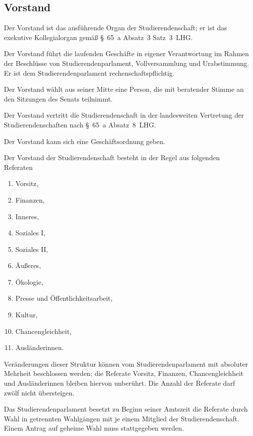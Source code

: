 \begin{contract}
%
%

\parnumberfalse \section{Vorstand} \parnumbertrue


Der Vorstand ist das ausführende Organ der Studierendenschaft; er ist das exekutive Kollegialorgan gemäß §~65~a Absatz~3 Satz~3~LHG. 

Der Vorstand führt die laufenden Geschäfte in eigener Verantwortung im Rahmen der Beschlüsse von Studierendenparlament, Vollversammlung und Urabstimmung. Er ist dem Studierendenparlament rechenschaftspflichtig.

Der Vorstand wählt aus seiner Mitte eine Person, die mit beratender Stimme an den Sitzungen des Senats teilnimmt.

Der Vorstand vertritt die Studierendenschaft in der landesweiten Vertretung der Studierendenschaften nach §~65~a Absatz~8~LHG.

Der Vorstand kann sich eine Geschäftsordnung geben.


 \label{vorstand:zusammensetzung}

Der Vorstand der Studierendenschaft besteht in der Regel aus folgenden Referaten \label{vorstand:zusammensetzung:regel}
\begin{enumerate}
\item Vorsitz,
\item Finanzen,
\item Inneres,
\item Soziales I,
\item Soziales II,
\item Äußeres,
\item Ökologie,
\item Presse und Öffentlichkeitsarbeit,
\item Kultur,
\item Chancengleichheit,
\item Ausländerinnen.
\end{enumerate}
Veränderungen dieser Struktur können vom Studierendenparlament mit absoluter Mehrheit beschlossen werden; die Referate Vorsitz, Finanzen, Chancengleichheit und Ausländerinnen bleiben hiervon unberührt. Die Anzahl der Referate darf zwölf nicht übersteigen.

Das Studierendenparlament besetzt zu Beginn seiner Amtszeit die Referate durch Wahl in getrennten Wahlgängen mit je einem Mitglied der Studierendenschaft. Einem Antrag auf geheime Wahl muss stattgegeben werden\label{vorstand:zusammensetzung:wahl}.


\end{contract}
